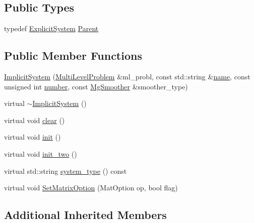 \subsection*{Public Types}
\begin{DoxyCompactItemize}
\item 
typedef \mbox{\hyperlink{classfemus_1_1_explicit_system}{Explicit\+System}} \mbox{\hyperlink{classfemus_1_1_implicit_system_a39f96fc06470f93e2f1ec047e5aafd4a}{Parent}}
\end{DoxyCompactItemize}
\subsection*{Public Member Functions}
\begin{DoxyCompactItemize}
\item 
\mbox{\hyperlink{classfemus_1_1_implicit_system_a68d8a8ebd9a07e0b4115b39ecb03e06a}{Implicit\+System}} (\mbox{\hyperlink{classfemus_1_1_multi_level_problem}{Multi\+Level\+Problem}} \&ml\+\_\+probl, const std\+::string \&\mbox{\hyperlink{classfemus_1_1_system_a1a007c176529dae649887bbd1cb46103}{name}}, const unsigned int \mbox{\hyperlink{classfemus_1_1_system_a28f5c7f6286dd597ae28a8923c8dca11}{number}}, const \mbox{\hyperlink{_mg_smoother_enum_8hpp_a4d11c2ff93e2f0f440c879a9c40cda71}{Mg\+Smoother}} \&smoother\+\_\+type)
\item 
virtual \mbox{\hyperlink{classfemus_1_1_implicit_system_a97fac2422cf7b0c95b38e2ff00dbf708}{$\sim$\+Implicit\+System}} ()
\item 
virtual void \mbox{\hyperlink{classfemus_1_1_implicit_system_a0d5395e6a8de6625f9059384b990f83f}{clear}} ()
\item 
virtual void \mbox{\hyperlink{classfemus_1_1_implicit_system_a098b8d66e167a03759ca089bf0f0dc11}{init}} ()
\item 
virtual void \mbox{\hyperlink{classfemus_1_1_implicit_system_a544e5b2b89fd2f8497b3ca6befce74d1}{init\+\_\+two}} ()
\item 
virtual std\+::string \mbox{\hyperlink{classfemus_1_1_implicit_system_aee5e08a09a2d289aa777914018931592}{system\+\_\+type}} () const
\item 
virtual void \mbox{\hyperlink{classfemus_1_1_implicit_system_ab87b4c9e86b8262acbdc1f536ead7001}{Set\+Matrix\+Option}} (Mat\+Option op, bool flag)
\end{DoxyCompactItemize}
\subsection*{Additional Inherited Members}



